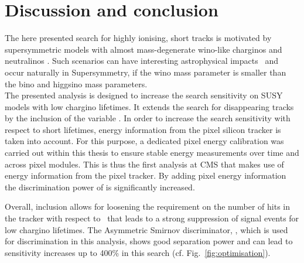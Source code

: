 \clearpage
\FloatBarrier
\chapter{Discussion and conclusion}
\label{sec:Discussion}

The here presented search for highly ionising, short tracks is motivated by supersymmetric models with almost mass-degenerate wino-like charginos \chipm and neutralinos \chiO.
Such scenarios can have interesting astrophysical impacts~\cite{bib:Moroi:DarkMatter_2013} and occur naturally in Supersymmetry, if the wino mass parameter is smaller than the bino and higgsino mass parameters.\\

The presented analysis is designed to increase the search sensitivity on SUSY models with low chargino lifetimes.
It extends the search for disappearing tracks~\cite{bib:CMS:DT_8TeV} by the inclusion of the variable \dedx.
In order to increase the search sensitivity with respect to short lifetimes, energy information from the pixel silicon tracker is taken into account.
For this purpose, a dedicated pixel energy calibration was carried out within this thesis to ensure stable energy measurements over time and across pixel modules.
This is thus the first analysis at CMS that makes use of energy information from the pixel tracker.
By adding pixel energy information the discrimination power of \dedx is significantly increased.

Overall, \dedx inclusion allows for loosening the requirement on the number of hits in the tracker with respect to~\cite{bib:CMS:DT_8TeV} that leads to a strong suppression of signal events for low chargino lifetimes. 
The Asymmetric Smirnov discriminator, \ias, which is used for \dedx discrimination in this analysis, shows good separation power and can lead to sensitivity increases up to 400\% in this search (cf. Fig.~\ref{fig:optimisation}).\\

